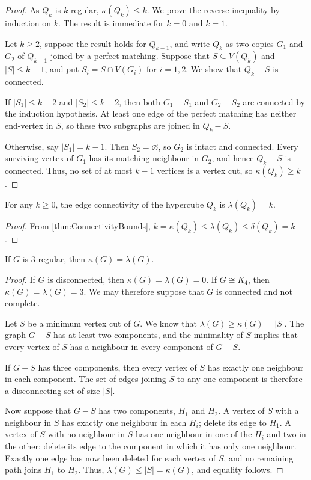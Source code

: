 \begin{proof}
As $Q_k$ is $k$-regular, $\kappa(Q_k)\le k$. We prove the reverse inequality by induction on $k$. The result is immediate for $k=0$ and $k=1$.

Let $k\ge2$, suppose the result holds for $Q_{k-1}$, and write $Q_k$ as two copies $G_1$ and $G_2$ of $Q_{k-1}$ joined by a perfect matching. Suppose that $S\subseteq V(Q_k)$ and $|S|\le k-1$, and put $S_i=S\cap V(G_i)$ for $i=1,2$. We show that $Q_k-S$ is connected.

If $|S_1|\le k-2$ and $|S_2|\le k-2$, then both $G_1-S_1$ and $G_2-S_2$ are connected by the induction hypothesis. At least one edge of the perfect matching has neither end-vertex in $S$, so these two subgraphs are joined in $Q_k-S$.

Otherwise, say $|S_1|=k-1$. Then $S_2=\varnothing$, so $G_2$ is intact and connected. Every surviving vertex of $G_1$ has its matching neighbour in $G_2$, and hence $Q_k-S$ is connected. Thus, no set of at most $k-1$ vertices is a vertex cut, so $\kappa(Q_k)\ge k$.
\end{proof}

\begin{Corollary}
For any $k \ge 0$, the edge connectivity of the hypercube $Q_k$ is $\lambda(Q_k) = k$.
\end{Corollary}

\begin{proof}
From \cref{thm:ConnectivityBounds}, $k = \kappa(Q_k) \le \lambda(Q_k) \le \delta(Q_k) = k$.
\end{proof}

\begin{Theorem}
If $G$ is $3$-regular, then $\kappa(G) = \lambda(G)$.
\end{Theorem}

\begin{proof}
If $G$ is disconnected, then $\kappa(G)=\lambda(G)=0$. If $G\cong K_4$, then $\kappa(G)=\lambda(G)=3$. We may therefore suppose that $G$ is connected and not complete.

Let $S$ be a minimum vertex cut of $G$. We know that $\lambda(G)\ge\kappa(G)=|S|$. The graph $G-S$ has at least two components, and the minimality of $S$ implies that every vertex of $S$ has a neighbour in every component of $G-S$.

If $G-S$ has three components, then every vertex of $S$ has exactly one neighbour in each component. The set of edges joining $S$ to any one component is therefore a disconnecting set of size $|S|$.

Now suppose that $G-S$ has two components, $H_1$ and $H_2$. A vertex of $S$ with a neighbour in $S$ has exactly one neighbour in each $H_i$; delete its edge to $H_1$. A vertex of $S$ with no neighbour in $S$ has one neighbour in one of the $H_i$ and two in the other; delete its edge to the component in which it has only one neighbour. Exactly one edge has now been deleted for each vertex of $S$, and no remaining path joins $H_1$ to $H_2$. Thus, $\lambda(G)\le|S|=\kappa(G)$, and equality follows.
\end{proof}

